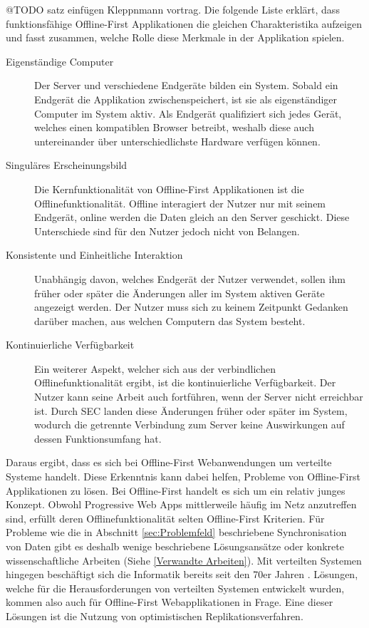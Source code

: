 \documentclass[a4paper, 12pt]{scrreprt}
\begin{document}
@TODO satz einfügen Kleppnmann vortrag.
Die folgende Liste erklärt, dass funktionsfähige Offline-First Applikationen die gleichen Charakteristika aufzeigen und fasst zusammen, welche Rolle diese Merkmale in der Applikation spielen.

\begin{description}		
\item[Eigenständige Computer] Der Server und verschiedene Endgeräte bilden ein System. Sobald ein Endgerät die Applikation zwischenspeichert, ist sie als eigenständiger Computer im System aktiv. Als Endgerät qualifiziert sich jedes Gerät, welches einen kompatiblen Browser betreibt, weshalb diese auch untereinander über unterschiedlichste Hardware verfügen können.
\item[Singuläres Erscheinungsbild]Die Kernfunktionalität von Offline-First Applikationen ist die Offlinefunktionalität. Offline interagiert der Nutzer nur mit seinem Endgerät, online werden die Daten gleich an den Server geschickt. Diese Unterschiede sind für den Nutzer jedoch nicht von Belangen. \item[Konsistente und Einheitliche Interaktion]
Unabhängig davon, welches Endgerät der Nutzer verwendet, sollen ihm früher oder später die Änderungen aller im System aktiven Geräte angezeigt werden. Der Nutzer muss sich zu keinem Zeitpunkt Gedanken darüber machen, aus welchen Computern das System besteht.
\item[Kontinuierliche Verfügbarkeit]
Ein weiterer Aspekt, welcher sich aus der verbindlichen Offlinefunktionalität ergibt, ist die kontinuierliche Verfügbarkeit. Der Nutzer kann seine Arbeit auch fortführen, wenn der Server nicht erreichbar ist. Durch SEC landen diese Änderungen früher oder später im System, wodurch die getrennte Verbindung zum Server keine Auswirkungen auf dessen Funktionsumfang hat. 
\end{description}
\label{tab:charakteristikaOfflineFirst}

Daraus ergibt, dass es sich bei Offline-First Webanwendungen um verteilte Systeme handelt. Diese Erkenntnis kann dabei helfen, Probleme von Offline-First Applikationen zu lösen. Bei Offline-First handelt es sich um ein relativ junges Konzept. Obwohl Progressive Web Apps mittlerweile häufig im Netz anzutreffen sind, erfüllt deren Offlinefunktionalität selten Offline-First Kriterien. Für Probleme wie die in Abschnitt \ref{sec:Problemfeld} beschriebene Synchronisation von Daten gibt es deshalb wenige beschriebene Lösungsansätze oder konkrete wissenschaftliche Arbeiten (Siehe \ref{Verwandte Arbeiten}). Mit verteilten Systemen hingegen beschäftigt sich die Informatik bereits seit den 70er Jahren \autocite{Andrews1999FoundationsOM}. Lösungen, welche für die Herausforderungen von verteilten Systemen entwickelt wurden, kommen also auch für Offline-First Webapplikationen in Frage. Eine dieser Lösungen ist die Nutzung von optimistischen Replikationsverfahren. 
\end{document}
